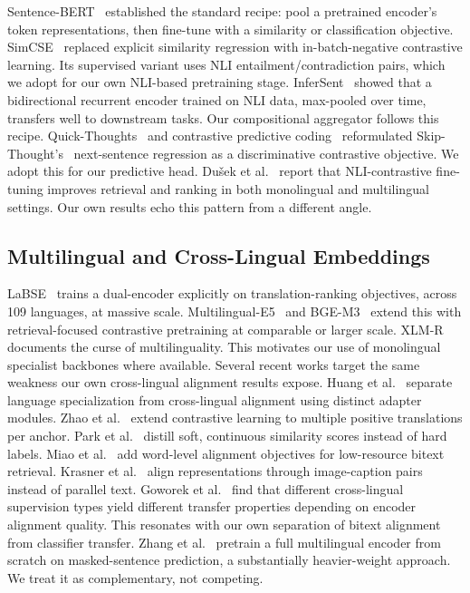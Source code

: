 \documentclass[manuscript]{acmart}
\begin{document}
Sentence-BERT~\citep{reimers2019sbert} established the standard recipe: pool a pretrained encoder's token representations, then fine-tune with a similarity or classification objective. SimCSE~\citep{gao2021simcse} replaced explicit similarity regression with in-batch-negative contrastive learning. Its supervised variant uses NLI entailment/contradiction pairs, which we adopt for our own NLI-based pretraining stage. InferSent~\citep{conneau2017infersent} showed that a bidirectional recurrent encoder trained on NLI data, max-pooled over time, transfers well to downstream tasks. Our compositional aggregator follows this recipe. Quick-Thoughts~\citep{logeswaran2018quickthoughts} and contrastive predictive coding~\citep{oord2018cpc} reformulated Skip-Thought's~\citep{kiros2015skipthought} next-sentence regression as a discriminative contrastive objective. We adopt this for our predictive head. Dušek et al.~\citep{dusek2023nli} report that NLI-contrastive fine-tuning improves retrieval and ranking in both monolingual and multilingual settings. Our own results echo this pattern from a different angle.

\subsection{Multilingual and Cross-Lingual Embeddings}

LaBSE~\citep{feng2020labse} trains a dual-encoder explicitly on translation-ranking objectives, across 109 languages, at massive scale. Multilingual-E5~\citep{wang2024me5} and BGE-M3~\citep{chen2024bgem3} extend this with retrieval-focused contrastive pretraining at comparable or larger scale. XLM-R~\citep{conneau2020xlmr} documents the curse of multilinguality. This motivates our use of monolingual specialist backbones where available. Several recent works target the same weakness our own cross-lingual alignment results expose. Huang et al.~\citep{huang2025modular} separate language specialization from cross-lingual alignment using distinct adapter modules. Zhao et al.~\citep{zhao2024mpcl} extend contrastive learning to multiple positive translations per anchor. Park et al.~\citep{park2024softcontrastive} distill soft, continuous similarity scores instead of hard labels. Miao et al.~\citep{miao2024wacse} add word-level alignment objectives for low-resource bitext retrieval. Krasner et al.~\citep{krasner2025multimodal} align representations through image-caption pairs instead of parallel text. Goworek et al.~\citep{goworek2025clir} find that different cross-lingual supervision types yield different transfer properties depending on encoder alignment quality. This resonates with our own separation of bitext alignment from classifier transfer. Zhang et al.~\citep{zhang2023msm} pretrain a full multilingual encoder from scratch on masked-sentence prediction, a substantially heavier-weight approach. We treat it as complementary, not competing.
\end{document}
